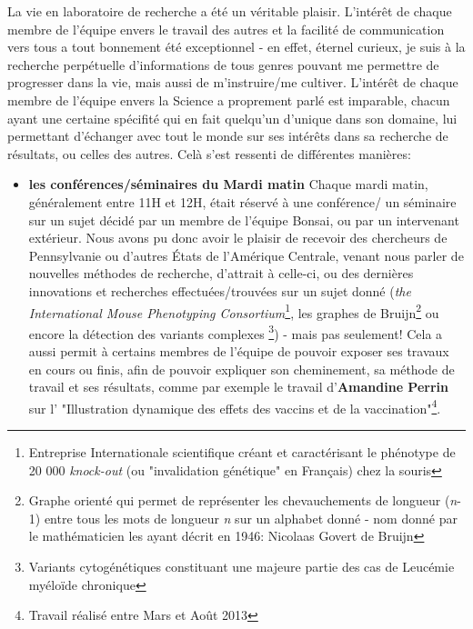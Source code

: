 \documentclass[12pt]{report}
\begin{document}
\begin{spacing}{1.2}
La vie en laboratoire de recherche a été un véritable plaisir.
\newline
L'intérêt de chaque membre de l'équipe envers le travail des autres et la facilité de communication vers tous a tout bonnement été exceptionnel - en effet, éternel curieux, je suis à la recherche perpétuelle d'informations de tous genres pouvant me permettre de progresser dans la vie, mais aussi de m'instruire/me cultiver. L'intérêt de chaque membre de l'équipe envers la Science a proprement parlé est imparable, chacun ayant une certaine spécifité qui en fait quelqu'un d'unique dans son domaine, lui permettant d'échanger avec tout le monde sur ses intérêts dans sa recherche de résultats, ou celles des autres.
\newline
Celà s'est ressenti de différentes manières:
\begin{itemize}
\item \textbf{les conférences/séminaires du Mardi matin}
	\newline
	Chaque mardi matin, généralement entre 11H et 12H, était réservé à une conférence/ un séminaire sur un sujet décidé par un membre de l'équipe Bonsai, ou par un intervenant extérieur.
	\newline
	Nous avons pu donc avoir le plaisir de recevoir des chercheurs de Pennsylvanie ou d'autres États de l'Amérique Centrale, venant nous parler de nouvelles méthodes de recherche, d'attrait à celle-ci, ou des dernières innovations et recherches effectuées/trouvées sur un sujet donné (\textit{the International Mouse Phenotyping Consortium}\footnote{Entreprise Internationale scientifique créant et caractérisant le phénotype de 20 000 \textit{knock-out} (ou "invalidation génétique" en Français) chez la souris}, les graphes de Bruijn\footnote{Graphe orienté qui permet de représenter les chevauchements de longueur (\textit{n}-1) entre tous les mots de longueur \textit{n} sur un alphabet donné - nom donné par le mathématicien les ayant décrit en 1946: Nicolaas Govert de Bruijn} ou encore la détection des variants complexes \footnote{Variants cytogénétiques constituant une majeure partie des cas de Leucémie myéloïde chronique}) -  mais pas seulement!
	\newline
	Cela a aussi permit à certains membres de l'équipe de pouvoir exposer ses travaux en cours ou finis, afin de pouvoir expliquer son cheminement, sa méthode de travail et ses résultats, comme par exemple le travail d'\textbf{Amandine Perrin} sur l' "Illustration dynamique des effets des vaccins et de la vaccination"\footnote{Travail réalisé entre Mars et Août 2013}.

\end{itemize}
\end{spacing}
\end{document}
